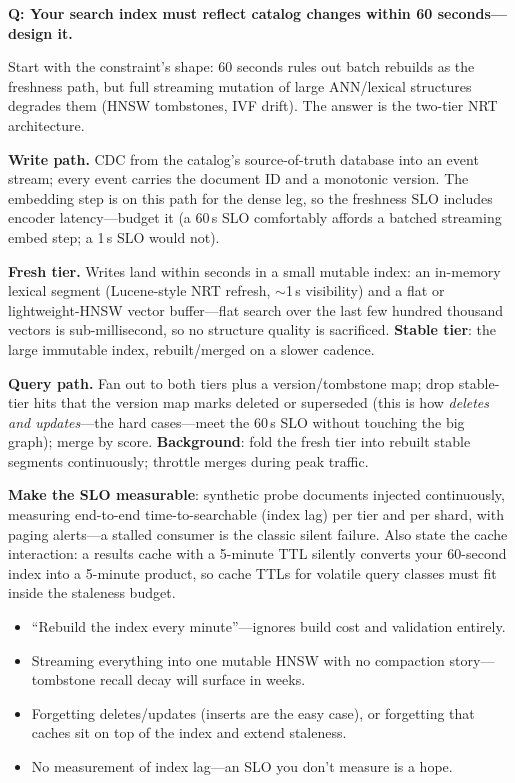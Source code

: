 \begin{interviewq}
\textbf{Q: Your search index must reflect catalog changes within 60 seconds---design it.}

 \quad {} \quad \badgefreq{\freqhigh}

\stronganswer

Start with the constraint's shape: 60 seconds rules out batch rebuilds as the freshness path, but full streaming mutation of large ANN/lexical structures degrades them (HNSW tombstones, IVF drift). The answer is the two-tier NRT architecture.

\textbf{Write path.} CDC from the catalog's source-of-truth database into an event stream; every event carries the document ID and a monotonic version. The embedding step is on this path for the dense leg, so the freshness SLO includes encoder latency---budget it (a 60\,s SLO comfortably affords a batched streaming embed step; a 1\,s SLO would not).

\textbf{Fresh tier.} Writes land within seconds in a small mutable index: an in-memory lexical segment (Lucene-style NRT refresh, $\sim$1\,s visibility) and a flat or lightweight-HNSW vector buffer---flat search over the last few hundred thousand vectors is sub-millisecond, so no structure quality is sacrificed. \textbf{Stable tier}: the large immutable index, rebuilt/merged on a slower cadence.

\textbf{Query path.} Fan out to both tiers plus a version/tombstone map; drop stable-tier hits that the version map marks deleted or superseded (this is how \textit{deletes and updates}---the hard cases---meet the 60\,s SLO without touching the big graph); merge by score. \textbf{Background}: fold the fresh tier into rebuilt stable segments continuously; throttle merges during peak traffic.

\textbf{Make the SLO measurable}: synthetic probe documents injected continuously, measuring end-to-end time-to-searchable (index lag) per tier and per shard, with paging alerts---a stalled consumer is the classic silent failure. Also state the cache interaction: a results cache with a 5-minute TTL silently converts your 60-second index into a 5-minute product, so cache TTLs for volatile query classes must fit inside the staleness budget.

\redflags
\begin{itemize}
    \item ``Rebuild the index every minute''---ignores build cost and validation entirely.
    \item Streaming everything into one mutable HNSW with no compaction story---tombstone recall decay will surface in weeks.
    \item Forgetting deletes/updates (inserts are the easy case), or forgetting that caches sit on top of the index and extend staleness.
    \item No measurement of index lag---an SLO you don't measure is a hope.
\end{itemize}


\end{interviewq}
